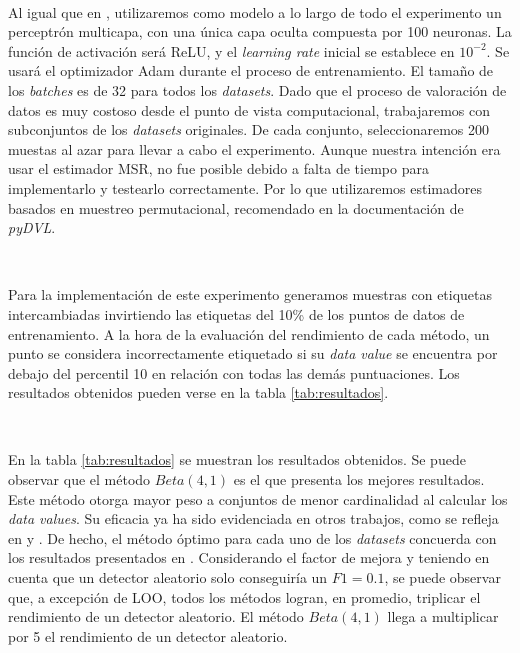 \

Al igual que en \cite{dataBanzhaf}, utilizaremos como modelo a lo
largo de todo el experimento un perceptrón multicapa, con una única
capa oculta compuesta por 100 neuronas. La función de activación
será ReLU, y el \textit{learning rate}
inicial se establece en $10^{-2}$. Se usará el optimizador
Adam durante el proceso de entrenamiento. El tamaño de los
\textit{batches} es de 32 para todos los
\textit{datasets}. Dado que el proceso de valoración de datos
es muy costoso desde el punto de vista computacional, trabajaremos
con subconjuntos de los \textit{datasets} originales. De cada
conjunto, seleccionaremos 200 muestas al azar para
llevar a cabo el experimento. Aunque nuestra intención era usar
el estimador MSR, no fue posible debido a falta de tiempo para
implementarlo y testearlo correctamente. Por lo que utilizaremos
estimadores basados en muestreo permutacional,
recomendado en la documentación de \textit{pyDVL}.

\

Para la implementación de este experimento generamos muestras
con etiquetas intercambiadas invirtiendo las
etiquetas del 10\% de los puntos de datos de entrenamiento.
A la hora de la evaluación del rendimiento de cada método, un punto
se considera incorrectamente etiquetado si su
\textit{data value} se encuentra por debajo del percentil
10 en relación con todas las demás puntuaciones.
Los resultados obtenidos pueden verse en la tabla
\ref{tab:resultados}.

\

En la tabla \ref{tab:resultados} se muestran los resultados
obtenidos. Se puede observar que el método $Beta(4,1)$ es el que
presenta los mejores resultados. Este método otorga mayor peso a
conjuntos de menor cardinalidad al calcular los \textit{data values}.
Su eficacia ya ha sido evidenciada en otros trabajos, como se
refleja en \cite{dataBanzhaf} y \cite{betaShapley}. De hecho, el
método óptimo para cada uno de los \textit{datasets} concuerda con
los resultados presentados en \cite{dataBanzhaf}.
Considerando el factor de mejora y teniendo en cuenta que un detector
aleatorio solo conseguiría un $F1 = 0.1$, se puede observar que, a
excepción de LOO, todos los métodos logran, en promedio, triplicar
el rendimiento de un detector aleatorio. El método $Beta(4,1)$
llega a multiplicar por 5 el rendimiento de un detector aleatorio.


